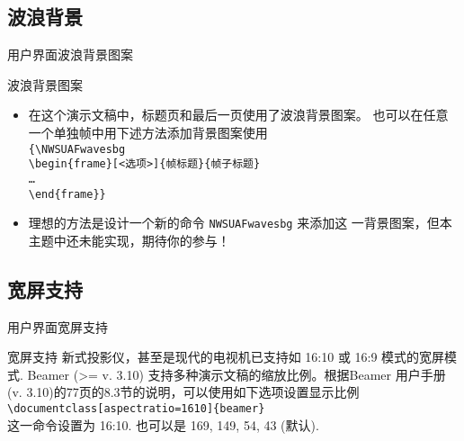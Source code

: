 \subsection{波浪背景}
\begin{frame}{用户界面}{波浪背景图案}
  \begin{block}{波浪背景图案}
    \begin{itemize}
    \item<1-> 在这个演示文稿中，标题页和最后一页使用了波浪背景图案。
      也可以在任意一个单独帧中用下述方法添加背景图案使用\\
      {\tt \{\textbackslash NWSUAFwavesbg\\
        \textbackslash begin\{frame\}[<选项>]\{帧标题\}\{帧子标题\}\\
        \ldots\\
        \textbackslash end\{frame\}\}}
    \item<2-> 理想的方法是设计一个新的命令 {\tt NWSUAFwavesbg} 来添加这
      一背景图案，但本主题中还未能实现，期待你的参与！
    \end{itemize}
  \end{block}
\end{frame}

\subsection{宽屏支持}
\begin{frame}{用户界面}{宽屏支持}
  \begin{block}{宽屏支持}
    新式投影仪，甚至是现代的电视机已支持如 16:10 或 16:9 模式的宽屏模式.
    Beamer (>= v. 3.10) 支持多种演示文稿的缩放比例。根据Beamer 用户手册
    (v. 3.10)的77页的8.3节的说明，可以使用如下选项设置显示比例\\
    {\tt\textbackslash documentclass[aspectratio=1610]\{beamer\}}\\
    这一命令设置为 16:10. 也可以是 169, 149, 54, 43 (默认).
  \end{block}
\end{frame}


